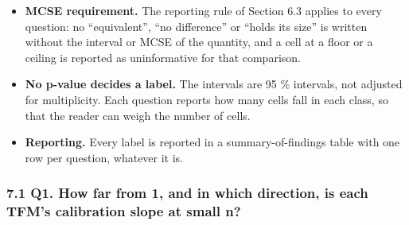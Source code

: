 \documentclass[
  10pt,
]{article}
\providecommand{\tightlist}{%
  \setlength{\itemsep}{0pt}\setlength{\parskip}{0pt}}
\begin{document}
\begin{itemize}
  \begin{itemize}
  \tightlist
  \item
    true ICI: delta = 0.01, the margin of Section 6.4; at pi
    = 3 \% it is multiplied by 0.3 (delta = 0.003), by the
    rule for probability-scale thresholds of Section 4.5;
  \item
    \textbar log b*\textbar: delta = log 1.1, the slope
    margin of Section 6.4;
  \item
    \textbar a*\textbar: delta = 0.05, half the
    weak-calibration tolerance on a* (Section 4.5).
  \end{itemize}
\item
  \textbf{MCSE requirement.} The reporting rule of Section
  6.3 applies to every question: no ``equivalent'', ``no
  difference'' or ``holds its size'' is written without the
  interval or MCSE of the quantity, and a cell at a floor or
  a ceiling is reported as uninformative for that
  comparison.
\item
  \textbf{No p-value decides a label.} The intervals are 95
  \% intervals, not adjusted for multiplicity. Each question
  reports how many cells fall in each class, so that the
  reader can weigh the number of cells.
\item
  \textbf{Reporting.} Every label is reported in a
  summary-of-findings table with one row per question,
  whatever it is.
\end{itemize}

\subsubsection{7.1 Q1. How far from 1, and in which
direction, is each TFM's calibration slope at small
n?}\label{q1.-how-far-from-1-and-in-which-direction-is-each-tfms-calibration-slope-at-small-n}
\end{document}
